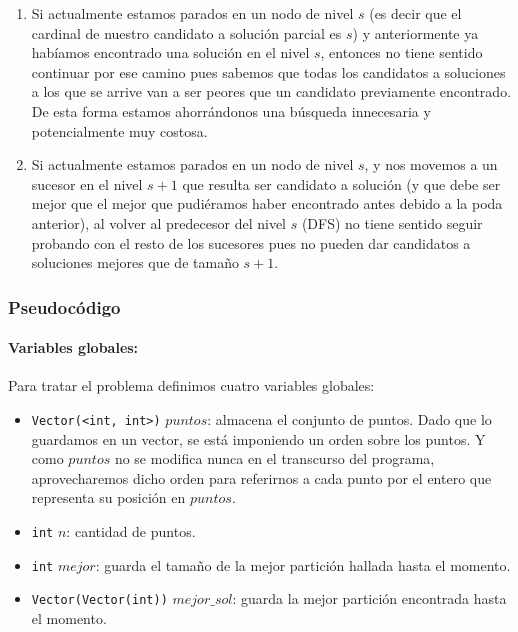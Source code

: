 \begin{enumerate}
  \item Si actualmente estamos parados en un nodo de nivel $s$ (es decir que el cardinal de nuestro candidato a solución parcial es $s$) y anteriormente ya habíamos encontrado una solución en el nivel $s$, entonces no tiene sentido continuar por ese camino pues sabemos que todas los candidatos a soluciones a los que se arrive van a ser peores que un candidato previamente encontrado. De esta forma estamos ahorrándonos una búsqueda innecesaria y potencialmente muy costosa.
  \item Si actualmente estamos parados en un nodo de nivel $s$, y nos movemos a un sucesor en el nivel $s+1$ que resulta ser candidato a solución (y que debe ser mejor que el mejor que pudiéramos haber encontrado antes debido a la poda anterior), al volver al predecesor del nivel $s$ (DFS) no tiene sentido seguir probando con el resto de los sucesores pues no pueden dar candidatos a soluciones mejores que de tamaño $s+1$.
\end{enumerate}

\subsubsection{Pseudocódigo}
  \paragraph{Variables globales:} Para tratar el problema definimos cuatro variables globales:
  \begin{itemize}
    \item \texttt{Vector(<int, int>)} $puntos$: almacena el conjunto de puntos. Dado que lo guardamos en un vector, se está imponiendo un orden sobre los puntos. Y como $puntos$ no se modifica nunca en el transcurso del programa, aprovecharemos dicho orden para referirnos a cada punto por el entero que representa su posición en $puntos$.
    \item \texttt{int} $n$: cantidad de puntos.
    \item \texttt{int} $mejor$: guarda el tamaño de la mejor partición hallada hasta el momento.
    \item \texttt{Vector(Vector(int))} $mejor\_sol$: guarda la mejor partición encontrada hasta el momento.
  \end{itemize}
